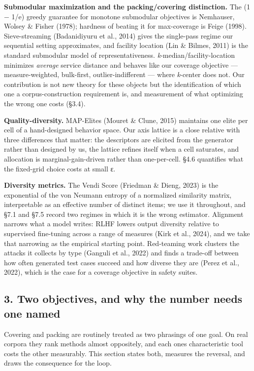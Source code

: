 \documentclass[
  10pt,
]{article}
\theoremstyle{plain}
\theoremstyle{definition}
\begin{document}
\textbf{Submodular maximization and the packing/covering distinction.}
The (1 − 1/e) greedy guarantee for monotone submodular objectives is
Nemhauser, Wolsey \& Fisher (1978); hardness of beating it for
max-coverage is Feige (1998). Sieve-streaming (Badanidiyuru et al.,
2014) gives the single-pass regime our sequential setting approximates,
and facility location (Lin \& Bilmes, 2011) is the standard submodular
model of representativeness. \emph{k}-median/facility-location minimizes
\emph{average} service distance and behaves like our coverage objective
--- measure-weighted, bulk-first, outlier-indifferent --- where
\emph{k}-center does not. Our contribution is not new theory for these
objects but the identification of which one a corpus-construction
requirement is, and measurement of what optimizing the wrong one costs
(§3.4).

\textbf{Quality-diversity.} MAP-Elites (Mouret \& Clune, 2015) maintains
one elite per cell of a hand-designed behavior space. Our axis lattice
is a close relative with three differences that matter: the descriptors
are elicited from the generator rather than designed by us, the lattice
refines itself when a cell saturates, and allocation is
marginal-gain-driven rather than one-per-cell. §4.6 quantifies what the
fixed-grid choice costs at small ε.

\textbf{Diversity metrics.} The Vendi Score (Friedman \& Dieng, 2023) is
the exponential of the von Neumann entropy of a normalized similarity
matrix, interpretable as an effective number of distinct items; we use
it throughout, and §7.1 and §7.5 record two regimes in which it is the
wrong estimator. Alignment narrows what a model writes: RLHF lowers
output diversity relative to supervised fine-tuning across a range of
measures (Kirk et al., 2024), and we take that narrowing as the
empirical starting point. Red-teaming work clusters the attacks it
collects by type (Ganguli et al., 2022) and finds a trade-off between
how often generated test cases succeed and how diverse they are (Perez
et al., 2022), which is the case for a coverage objective in safety
suites.

\subsection{3. Two objectives, and why the number needs one
named}\label{3-two-objectives-and-why-the-number-needs-one-named}

Covering and packing are routinely treated as two phrasings of one goal.
On real corpora they rank methods almost oppositely, and each
one\textquotesingle s characteristic tool costs the other measurably.
This section states both, measures the reversal, and draws the
consequence for the loop.
\end{document}
